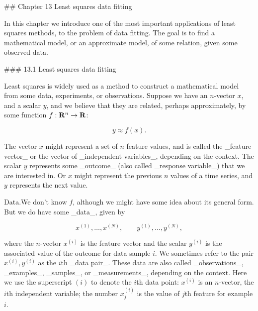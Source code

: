 

## Chapter 13 Least squares data fitting

In this chapter we introduce one of the most important applications of least squares methods, to the problem of data fitting. The goal is to find a mathematical model, or an approximate model, of some relation, given some observed data.

### 13.1 Least squares data fitting

Least squares is widely used as a method to construct a mathematical model from some data, experiments, or observations. Suppose we have an \(n\)-vector \(x\), and a scalar \(y\), and we believe that they are related, perhaps approximately, by some function \(f:{\bf R}^{n}\to{\bf R}\):

\[y\approx f(x).\]

The vector \(x\) might represent a set of \(n\) feature values, and is called the _feature vector_ or the vector of _independent variables_, depending on the context. The scalar \(y\) represents some _outcome_ (also called _response variable_) that we are interested in. Or \(x\) might represent the previous \(n\) values of a time series, and \(y\) represents the next value.

Data.We don't know \(f\), although we might have some idea about its general form. But we do have some _data_, given by

\[x^{(1)},\ldots,x^{(N)},\qquad y^{(1)},\ldots,y^{(N)},\]

where the \(n\)-vector \(x^{(i)}\) is the feature vector and the scalar \(y^{(i)}\) is the associated value of the outcome for data sample \(i\). We sometimes refer to the pair \(x^{(i)},y^{(i)}\) as the \(i\)th _data pair_. These data are also called _observations_, _examples_, _samples_, or _measurements_, depending on the context. Here we use the superscript \((i)\) to denote the \(i\)th data point: \(x^{(i)}\) is an \(n\)-vector, the \(i\)th independent variable; the number \(x^{(i)}_{j}\) is the value of \(j\)th feature for example \(i\).


